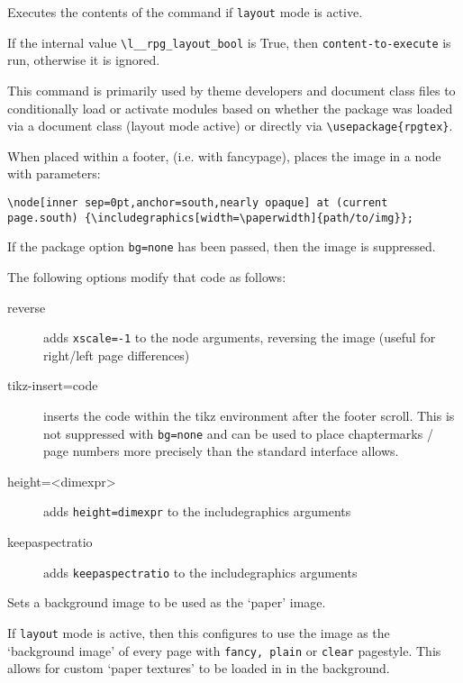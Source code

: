 		\begin{macrolist}
				{
					Executes the contents of the command if \verb|layout| mode is active.
				}
				{
				}
				{
					If the internal value \texttt{\textbackslash{}l\_\_rpg\_layout\_bool} is True, then \verb|content-to-execute| is run, otherwise it is ignored.

					This command is primarily used by theme developers and document class files to conditionally load or activate modules based on whether the package was loaded via a document class (layout mode active) or directly via \verb|\usepackage{rpgtex}|.
				}
				{
				}
				{
					When placed within a footer, (i.e. with fancypage), places the image in a node with parameters:
					
					\texttt{\textbackslash{}node[inner sep=0pt,anchor=south,nearly opaque] at (current page.south) \{\textbackslash{}includegraphics[width=\textbackslash{}paperwidth]\{path/to/img\}\};}

					If the package option \verb|bg=none| has been passed, then the image is suppressed.

					The following options modify that code as follows:
					\begin{description}
						\item[reverse] adds \verb|xscale=-1| to the node arguments, reversing the image (useful for right/left page differences)
						\item[tikz-insert={code}] inserts the code within the tikz environment after the footer scroll. This is not suppressed with \verb|bg=none| and can be used to place chaptermarks / page numbers more precisely than the standard interface allows.
						\item[height=<dimexpr>] adds \verb|height=dimexpr| to the includegraphics arguments
						\item[keepaspectratio] adds \verb|keepaspectratio| to the includegraphics arguments    
					\end{description}
				}
			\RpgMacro[RpgSetPaper]{\RpgSetPaper}
				{Sets a background image to be used as the `paper' image.}
				{
				}
				{
					If \verb|layout| mode is active, then this configures \rpgtex{} to use the image as the `background image' of every page with \verb|fancy, plain| or \verb|clear| pagestyle. This allows for custom `paper textures' to be loaded in in the background. 

}
\end{macrolist}
